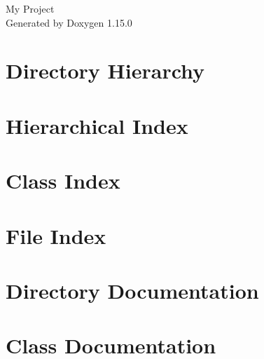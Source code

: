 \documentclass[twoside]{book}
\newcommand{\+}{\discretionary{\mbox{\scriptsize$\hookleftarrow$}}{}{}}
\newcommand{\clearemptydoublepage}{%
    \newpage{\pagestyle{empty}\cleardoublepage}%
  }
\begin{document}
  \raggedbottom
    \hypersetup{pageanchor=false,
                bookmarksnumbered=true,
                pdfencoding=unicode
               }
  \begin{titlepage}
  \vspace*{7cm}
  \begin{center}%
  {\Large My Project}\\
  \vspace*{1cm}
  {\large Generated by Doxygen 1.15.0}\\
  \end{center}
  \end{titlepage}
  \clearemptydoublepage
  \tableofcontents
  \clearemptydoublepage
  \hypersetup{pageanchor=true}
\chapter{Directory Hierarchy}

\chapter{Hierarchical Index}

\chapter{Class Index}

\chapter{File Index}

\chapter{Directory Documentation}




\chapter{Class Documentation}














\end{document}
